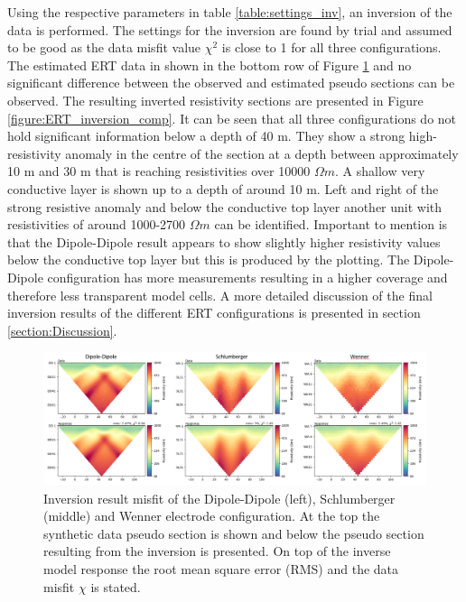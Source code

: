 Using the respective parameters in table \ref{table:settings_inv}, an inversion of the data is performed. The settings for the inversion are found by trial and assumed to be good as the data misfit value $\chi^2$ is close to 1 for all three configurations. The estimated ERT data in shown in the bottom row of Figure \ref{figure:ERT_inversion_misfits} and no significant difference between the observed and estimated pseudo sections can be observed. The resulting inverted resistivity sections are presented in Figure \ref{figure:ERT_inversion_comp}. It can be seen that all three configurations do not hold significant information below a depth of 40 m. They show a strong high-resistivity anomaly in the centre of the section at a depth between approximately 10 m and 30 m that is reaching resistivities over 10000 $\Omega m$. A shallow very conductive layer is shown up to a depth of around 10 m. Left and right of the strong resistive anomaly and below the conductive top layer another unit with resistivities of around 1000-2700 $\Omega m$ can be identified. Important to mention is that the Dipole-Dipole result appears to show slightly higher resistivity values below the conductive top layer but this is produced by the plotting. The Dipole-Dipole configuration has more measurements resulting in a higher coverage and therefore less transparent model cells. A more detailed discussion of the final inversion results of the different ERT configurations is presented in section \ref{section:Discussion}.

\begin{figure}[H]
  \centering
    \includegraphics[width=\textwidth]{Figures/ERT_inversion_overview.png}
    \caption[ERT inversion result misfit]{Inversion result misfit of the Dipole-Dipole (left), Schlumberger (middle) and Wenner electrode configuration. At the top the synthetic data pseudo section is shown and below the pseudo section resulting from the inversion is presented. On top of the inverse model response the root mean square error (RMS) and the data misfit $\chi$ is stated.}
    \label{figure:ERT_inversion_misfits}
\end{figure}

